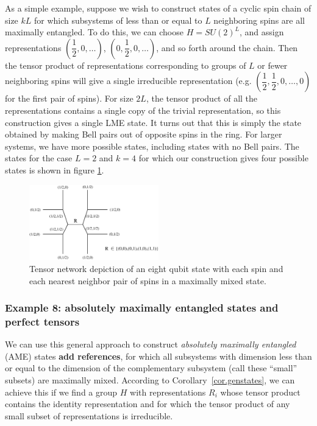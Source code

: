 \documentclass[12pt]{article}
\theoremstyle{definition}
\begin{document}
As a simple example, suppose we wish to construct states of a cyclic spin chain of size $kL$ for which subsystems of less than or equal to $L$ neighboring spins are all maximally entangled. To do this, we can choose $H = SU(2)^L$, and assign representations $(\dfrac{1}{2}, 0,\dots)$, $(0, \dfrac{1}{2}, 0,\dots)$, and so forth around the chain. Then the tensor product of representations corresponding to groups of $L$ or fewer neighboring spins will give a single irreducible representation (e.g. $(\dfrac{1}{2},\dfrac{1}{2}, 0, \dots, 0)$ for the first pair of spins). For size $2L$, the tensor product of all the representations contains a single copy of the trivial representation, so this construction gives a single LME state. It turns out that this is simply the state obtained by making Bell pairs out of opposite spins in the ring. For larger systems, we have more possible states, including states with no Bell pairs. The states for the case $L=2$ and $k=4$ for which our construction gives four possible states is shown in figure \ref{group2}.

\begin{figure}
\centering
\includegraphics[width=0.5\textwidth]{group2.eps}
\caption{Tensor network depiction of an eight qubit state with each spin and each nearest neighbor pair of spins in a maximally mixed state. }
\label{group2}
\end{figure}



\subsubsection*{Example 8: absolutely maximally entangled states and perfect tensors}

We can use this general approach to construct {\it absolutely
maximally entangled} (AME) states {\bf add references}, for which all subsystems with
dimension less than or equal to the dimension of the complementary
subsystem (call these ``small'' subsets) are maximally
mixed. According to Corollary~\ref{cor.genstates}, we can achieve this if we find a
group $H$ with representations $R_i$ whose tensor product contains the
identity representation and for which the tensor product of any small
subset of representations is irreducible. 
\end{document}
